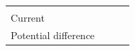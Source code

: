 \begin{enumerate}[noitemsep, label=\textbf{\arabic*}. ]
{\begin{center}
\begin{xtabular*}{\mytablewidth}[t]{|p{10\mystarwidth}|p{10\mystarwidth}|p{10\mystarwidth}|p{10\mystarwidth}|}
         &
    
    
     \tabularnewline{}
    
    
        Current &
    
    
         &
    
    
         &
    
    
     \tabularnewline{}
    
    
        Potential difference &
    
    
         &
    
    

\end{xtabular*}
\end{center}}
\end{enumerate}

